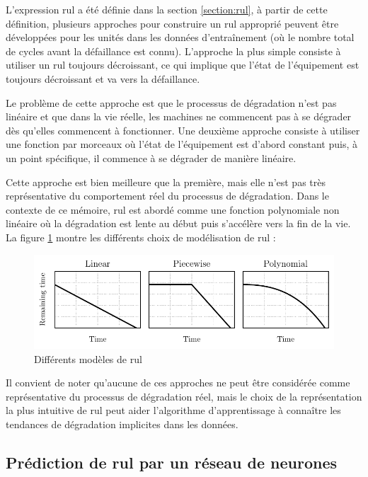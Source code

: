 L'expression \acrshort{rul} a été définie dans la section \ref{section:rul}, à partir de cette définition, plusieurs approches pour construire un \acrshort{rul} approprié peuvent être développées pour les unités dans les données d'entraînement (où le nombre total de cycles avant la défaillance est connu). L'approche la plus simple consiste à utiliser un \acrshort{rul} toujours décroissant, ce qui implique que l'état de l'équipement est toujours décroissant et va vers la défaillance.

Le problème de cette approche est que le processus de dégradation n'est pas linéaire et que dans la vie réelle, les machines ne commencent pas à se dégrader dès qu'elles commencent à fonctionner. Une deuxième approche consiste à utiliser une fonction par morceaux où l'état de l'équipement est d'abord constant puis, à un point spécifique, il commence à se dégrader de manière linéaire.

Cette approche est bien meilleure que la première, mais elle n'est pas très représentative du comportement réel du processus de dégradation. Dans le contexte de ce mémoire, \acrshort{rul} est abordé comme une fonction polynomiale non linéaire où la dégradation est lente au début puis s'accélère vers la fin de la vie. La figure \ref{fig:rul-models} montre les différents choix de modélisation de \acrshort{rul} :

\begin{figure}[H]
    \centering
    \includegraphics{figures/rul_models.pdf}
    \caption{Différents modèles de \acrshort{rul}}
    \label{fig:rul-models}
\end{figure}

Il convient de noter qu'aucune de ces approches ne peut être considérée comme représentative du processus de dégradation réel, mais le choix de la représentation la plus intuitive de \acrshort{rul} peut aider l'algorithme d'apprentissage à connaître les tendances de dégradation implicites dans les données.

\subsection{Prédiction de \acrshort{rul} par un réseau de neurones}

